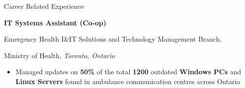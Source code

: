 \begin{rubric}{Career Related Experience}
\begin{itemize}
    \end{itemize}
%
%
	\textbf{IT Systems Assistant (Co-op)}
	\par Emergency Health I\&IT Solutions and Technology Management Branch,
	\par Ministry of Health, \emph{Toronto, Ontario}
	\begin{itemize}\vspace{-2mm}
     \item Managed updates on \textbf{50\%} of the total \textbf{1200} outdated \textbf{Windows PCs} and \textbf{Linux Servers} found in ambulance communication centres across Ontario
    \end{itemize}
\end{rubric}